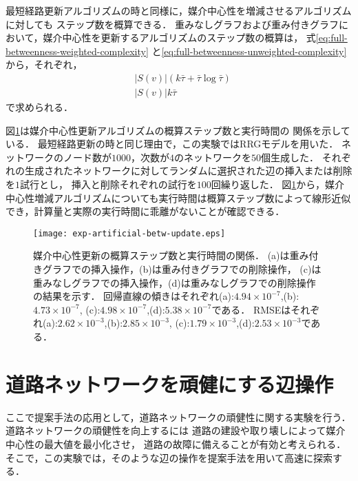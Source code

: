 最短経路更新アルゴリズムの時と同様に，媒介中心性を増減させるアルゴリズムに対しても
ステップ数を概算できる．
重みなしグラフおよび重み付きグラフにおいて，媒介中心性を更新するアルゴリズムのステップ数の概算は，
式\eqref{eq:full-betweenness-weighted-complexity}
と\eqref{eq:full-betweenness-unweighted-complexity}から，それぞれ，
\begin{align}
  &|S(v)|(k\bar{\tau}+\bar{\tau}\log\bar{\tau})
  \label{eq:pred-betw-steps-weighted} \\
  &|S(v)|k\bar{\tau}
  \label{eq:pred-betw-steps-unweighted}
\end{align}
で求められる．

図\ref{fig:exp-artificial-betw-update}は媒介中心性更新アルゴリズムの概算ステップ数と実行時間の
関係を示している．
最短経路更新の時と同じ理由で，この実験ではRRGモデルを用いた．
ネットワークのノード数が$1000$，次数が$4$のネットワークを$50$個生成した．
それぞれの生成されたネットワークに対してランダムに選択された辺の挿入または削除を$1$試行とし，
挿入と削除それぞれの試行を$100$回繰り返した．
図\ref{fig:exp-artificial-betw-update}から，媒介中心性増減アルゴリズムについても実行時間は概算ステップ数によって線形近似でき，計算量と実際の実行時間に乖離がないことが確認できる．

\begin{figure}
  \centering
  \texttt{[image: exp-artificial-betw-update.eps]}
  \caption{
    媒介中心性更新の概算ステップ数と実行時間の関係．
    (a)は重み付きグラフでの挿入操作，(b)は重み付きグラフでの削除操作，
    (c)は重みなしグラフでの挿入操作，(d)は重みなしグラフでの削除操作の結果を示す．
    回帰直線の傾きはそれぞれ(a):$4.94\times10^{-7}$,(b):$4.73\times10^{-7}$,
    (c):$4.98\times10^{-7}$,(d):$5.38\times10^{-7}$である．
    RMSEはそれぞれ(a):$2.62\times10^{-3}$,(b):$2.85\times10^{-3}$,
    (c):$1.79\times10^{-3}$,(d):$2.53\times10^{-3}$である．
  }
  \label{fig:exp-artificial-betw-update}
\end{figure}

\section{道路ネットワークを頑健にする辺操作}

ここで提案手法の応用として，道路ネットワークの頑健性に関する実験を行う．
道路ネットワークの頑健性を向上するには
道路の建設や取り壊しによって媒介中心性の最大値を最小化させ，
道路の故障に備えることが有効と考えられる．
そこで，この実験では，そのような辺の操作を提案手法を用いて高速に探索する．

